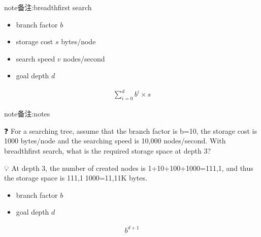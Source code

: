 \documentclass[letterpaper,10pt,english]{sphinxmanual}
\begin{document}
\begin{sphinxadmonition}{note}{备注:}{breadth\sphinxhyphen{}first search}

\sphinxAtStartPar
{}
\begin{itemize}
\item {} 
\sphinxAtStartPar
branch factor \(b\)

\item {} 
\sphinxAtStartPar
storage cost \(s\) bytes/node

\item {} 
\sphinxAtStartPar
search speed \(v\) nodes/second

\item {} 
\sphinxAtStartPar
goal depth \(d\)

\end{itemize}
\begin{equation*}
\begin{split}\sum_{i=0}^db^i\times s\end{split}
\end{equation*}
\begin{sphinxadmonition}{note}{备注:}{notes}

\begin{DUlineblock}{0em}
\item[] ❓ For a searching tree, assume that the branch factor is b=10, the storage cost is 1000 bytes/node and the searching speed is 10,000 nodes/second. With breadth\sphinxhyphen{}first search, what is the required storage space at depth 3?
\item[] 💡 At depth 3, the number of created nodes is 1+10+100+1000=111,1, and thus the storage space is 111,11000=11,11K bytes.
\end{DUlineblock}
\end{sphinxadmonition}

\sphinxAtStartPar
{}
\begin{itemize}
\item {} 
\sphinxAtStartPar
branch factor \(b\)

\item {} 
\sphinxAtStartPar
goal depth \(d\)

\end{itemize}
\begin{equation*}
\begin{split}b^{d+1}\end{split}
\end{equation*}\end{sphinxadmonition}
\end{document}
